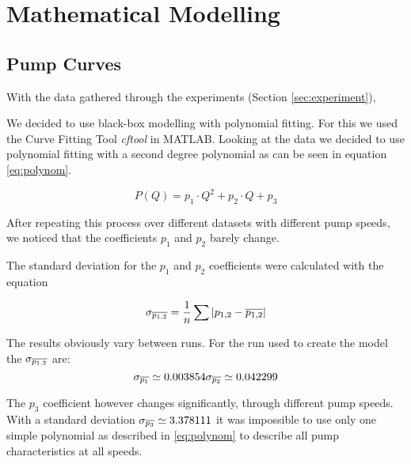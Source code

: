 \chapter{Mathematical Modelling}\label{ch:mathmodel}

\section{Pump Curves}\label{sec:pumpcurves}
With the data gathered through the experiments (Section \ref{sec:experiment}),

We decided to use black-box modelling with polynomial fitting.
For this we used the Curve Fitting Tool \cite{cftool}  \textit{cftool}  in MATLAB.
Looking at the data we decided to use polynomial fitting with a second degree polynomial
as can be seen in equation \ref{eq:polynom}.

\begin{equation}
	 P(Q) = p_1 \cdot Q^2 + p_2 \cdot Q + p_3
	 \label{eq:polynom}
\end{equation}

After repeating this process over different datasets with different pump speeds,
we noticed that the coefficients $p_1$ and $p_2$ barely change.

The standard deviation for the $p_1$ and $p_2$ coefficients were calculated with the equation 

\begin{equation}
	\sigma_{\overline{p_{1,2}}} = \dfrac{1}{n}\sum |p_{1,2}-\overline{p_{1,2}}|
	\label{eq:avedev}
\end{equation}

The results obviously vary between runs. For the run used to create the model the $\sigma_{\overline{p_{1,2}}}$ are:
\begin{equation}
	\sigma_{\mean{p_1}} \simeq 0.003854$$
	
	$$\sigma_{\mean{p_2}} \simeq 0.042299
\end{equation}

The $p_3$ coefficient however changes significantly, through different pump speeds.
With a standard deviation $\sigma_{\overline{p_3}} \simeq 3.378111$ it was impossible to use only one simple polynomial as described in \ref{eq:polynom} to describe all pump characteristics at all speeds.

